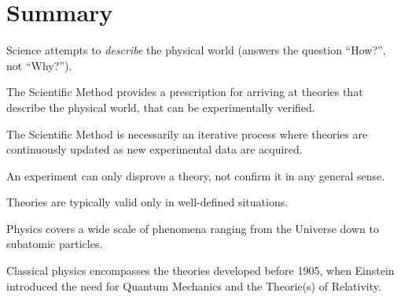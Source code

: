 \newpage
\section{Summary}
\vspace{2cm}
\begin{chapterSummary}
\item Science attempts to \textit{describe} the physical world (answers the question ``How?'', not ``Why?'').
\item The Scientific Method provides a prescription for arriving at theories that describe the physical world, that can be 
experimentally verified.
\item The Scientific Method is necessarily an iterative process where theories are continuously updated as new experimental data are acquired.
\item An experiment can only disprove a theory, not confirm it in any general sense.
\item Theories are typically valid only in well-defined situations.
\item Physics covers a wide scale of phenomena ranging from the Universe down to subatomic particles.
\item Classical physics encompasses the theories developed before 1905, when Einstein introduced the need for Quantum Mechanics and the Theorie(s) of Relativity.
\end{chapterSummary}

